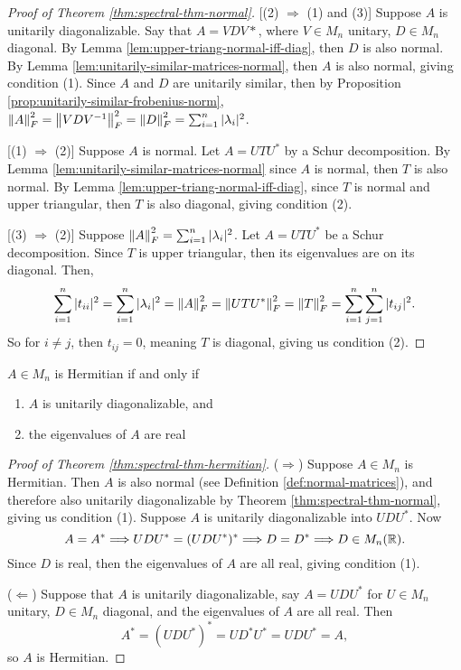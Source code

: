 \begin{proof}[Proof of Theorem \ref{thm:spectral-thm-normal}][(2) $\Longrightarrow$ (1) and (3)] Suppose $A$ is unitarily diagonalizable. Say that $A = VDV*$, where $V \in M_n$ unitary, $D \in M_n$ diagonal. By Lemma \ref{lem:upper-triang-normal-iff-diag}, then $D$ is also normal. By Lemma \ref{lem:unitarily-similar-matrices-normal}, then $A$ is also normal, giving condition (1). Since $A$ and $D$ are unitarily similar, then by Proposition \ref{prop:unitarily-similar-frobenius-norm}, $\left\lVert A\right\rVert_F^2 = \left\lVert VDV^{-1}\right\rVert_F^2 = \left\lVert D\right\rVert_F^2 = \sum_{i=1}^n |\lambda_i|^2$.

[(1) $\Longrightarrow$ (2)] Suppose $A$ is normal. Let $A = UTU^*$ by a Schur decomposition. By Lemma \ref{lem:unitarily-similar-matrices-normal} since $A$ is normal, then $T$ is also normal. By Lemma \ref{lem:upper-triang-normal-iff-diag}, since $T$ is normal and upper triangular, then $T$ is also diagonal, giving condition (2).

[(3) $\Longrightarrow$ (2)] Suppose $\left\lVert A\right\rVert_F^2 = \sum_{i=1}^n |\lambda_i|^2$. Let $A = UTU^*$ be a Schur decomposition. Since $T$ is upper triangular, then its eigenvalues are on its diagonal. Then,
$$
\sum_{i=1}^n |t_{ii}|^2 = \sum_{i=1}^n |\lambda_i|^2 = \left\lVert A\right\rVert_F^2 = \left\lVert UTU^*\right\rVert_F^2 = \left\lVert T\right\rVert_F^2 = \sum_{i=1}^n \sum_{j=1}^n |t_{ij}|^2.
$$
So for $i \not= j$, then $t_{ij} = 0$, meaning $T$ is diagonal, giving us condition (2).

\end{proof}

\begin{theorem}
\label{thm:spectral-thm-hermitian}
$A \in M_n$ is Hermitian if and only if
\begin{enumerate}[label=(\arabic*)]
    \item $A$ is unitarily diagonalizable, and
    \item the eigenvalues of $A$ are real
\end{enumerate}
\end{theorem}

\begin{proof}[Proof of Theorem \ref{thm:spectral-thm-hermitian}]
($\Longrightarrow$) Suppose $A \in M_n$ is Hermitian. Then $A$ is also normal (see Definition \ref{def:normal-matrices}), and therefore also unitarily diagonalizable by Theorem \ref{thm:spectral-thm-normal}, giving us condition (1). Suppose $A$ is unitarily diagonalizable into $UDU^*$. Now
$$
A = A^* \Longrightarrow UDU^* = (UDU^*)^* \Longrightarrow D = D^* \Longrightarrow D \in M_n(\mathbb R).
$$
Since $D$ is real, then the eigenvalues of $A$ are all real, giving condition (1).

($\Longleftarrow$) Suppose that $A$ is unitarily diagonalizable, say $A = UDU^*$ for $U \in M_n$ unitary, $D \in M_n$ diagonal, and the eigenvalues of $A$ are all real. Then
$$
A^* = (UDU^*)^* = UD^*U^* = UDU^* = A,
$$
so $A$ is Hermitian.
\end{proof}


